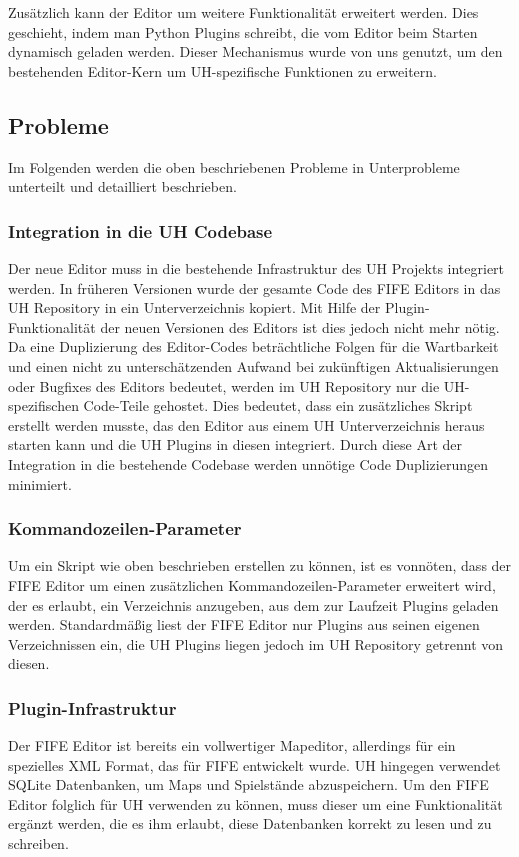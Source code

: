Zusätzlich kann der Editor um weitere Funktionalität erweitert werden. Dies geschieht,
indem man Python Plugins schreibt, die vom Editor beim Starten dynamisch geladen
werden. Dieser Mechanismus wurde von uns genutzt, um den bestehenden Editor-Kern
um UH-spezifische Funktionen zu erweitern.

\subsection{Probleme}
Im Folgenden werden die oben beschriebenen Probleme in Unterprobleme unterteilt
und detailliert beschrieben.

\subsubsection{Integration in die UH Codebase}
Der neue Editor muss in die bestehende Infrastruktur des UH Projekts integriert werden.
In früheren Versionen wurde der gesamte Code des FIFE Editors in das UH Repository
in ein Unterverzeichnis kopiert. Mit Hilfe der Plugin-Funktionalität der neuen Versionen
des Editors ist dies jedoch nicht mehr nötig. Da eine Duplizierung des Editor-Codes
beträchtliche Folgen für die Wartbarkeit und einen nicht zu unterschätzenden Aufwand
bei zukünftigen Aktualisierungen oder Bugfixes des Editors bedeutet, werden im UH
Repository nur die UH-spezifischen Code-Teile gehostet. Dies bedeutet, dass ein
zusätzliches Skript erstellt werden musste, das den Editor aus einem UH Unterverzeichnis
heraus starten kann und die UH Plugins in diesen integriert.
Durch diese Art der Integration in die bestehende Codebase werden unnötige
Code Duplizierungen minimiert.

\subsubsection{Kommandozeilen-Parameter}
Um ein Skript wie oben beschrieben erstellen zu können, ist es vonnöten, dass
der FIFE Editor um einen zusätzlichen Kommandozeilen-Parameter erweitert wird,
der es erlaubt, ein Verzeichnis anzugeben, aus dem zur Laufzeit Plugins geladen
werden.
Standardmäßig liest der FIFE Editor nur Plugins aus seinen eigenen
Verzeichnissen ein, die UH Plugins liegen jedoch im UH Repository getrennt von
diesen.

\subsubsection{Plugin-Infrastruktur}
\label{plugininfrastruktur}
Der FIFE Editor ist bereits ein vollwertiger Mapeditor, allerdings für ein spezielles XML Format,
das für FIFE entwickelt wurde. UH hingegen verwendet SQLite Datenbanken, um Maps und Spielstände
abzuspeichern. Um den FIFE Editor folglich für UH verwenden zu können, muss dieser um eine
Funktionalität ergänzt werden, die es ihm erlaubt, diese Datenbanken korrekt zu lesen und zu schreiben.

